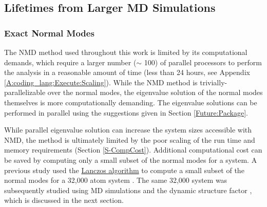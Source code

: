 % 

\subsection{\label{Future:Timescales}
Lifetimes from Larger MD Simulations}

\subsubsection{\label{Future:Timescales:NMD}
Exact Normal Modes}

The NMD method used throughout this work is limited by its computational 
demands, which require a larger number ($\sim$ 100) of parallel processors 
to perform the analysis in a reasonable amount of time 
(less than 24 hours, see Appendix \ref{A:coding_lang:Execute:Scaling}). 
While the NMD method is trivially-parallelizable over the normal 
modes, the eigenvalue solution of the normal modes themselves 
is more computationally demanding. 
The eigenvalue solutions can be performed in parallel using the suggestions 
given in Section \ref{Future:Package}. 
 
While parallel eigenvalue solution can increase the system sizes 
accessible with NMD, the method is ultimately limited by the 
poor scaling of the run time and memory requirements 
(Section \ref{S-CompCost}). 
Additional computational cost can be saved by computing only 
a small subset of the normal modes for a system. 
A previous study used the 
\href{http://en.wikipedia.org/wiki/Lanczos_algorithm}
{Lanczos algorithm}\cite{golub_matrix_2012} 
to compute a small subset of the normal modes
for a 32,000 atom system \cite{mazzacurati_low-frequency_1996}.  
The same 32,000 system was subsequently studied using MD simulations 
and the dynamic structure factor \cite{ruocco_relaxation_2000}, 
which is discussed in the next section.

